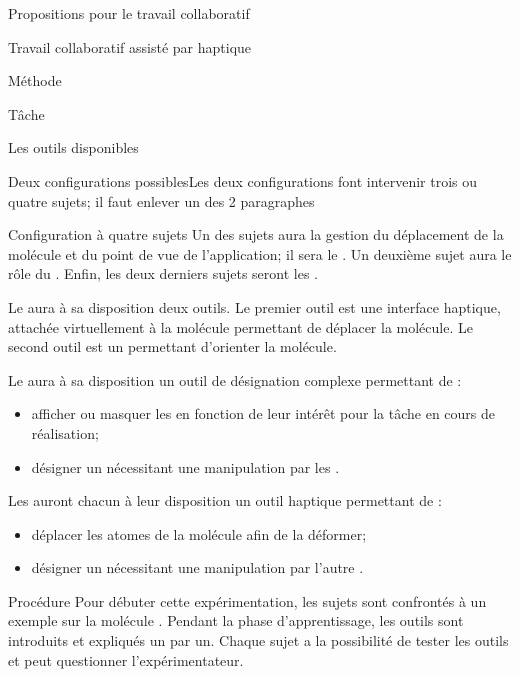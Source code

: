 \documentclass[myfrancais]{mythesis}
\begin{document}
\begin{mypart}{Propositions pour le travail collaboratif}
\begin{mychapter}{Travail collaboratif assisté par haptique}
\begin{mysection}{Méthode}
\begin{mysubsection}{Tâche}
\begin{mysubsubsection}{Les outils disponibles}
\begin{myTodo}{Deux configurations possibles}{Les deux configurations font intervenir trois ou quatre sujets; il faut enlever un des 2 paragraphes}
\begin{myparagraph}{Configuration à quatre sujets}
								Un des sujets aura la gestion du déplacement de la molécule et du point de vue de l'application; il sera le .
								Un deuxième sujet aura le rôle du .
								Enfin, les deux derniers sujets seront les .

								Le  aura à sa disposition deux outils.
								Le premier outil est une interface haptique, attachée virtuellement à la molécule permettant de déplacer la molécule.
								Le second outil est un \mySpaceNavigator permettant d'orienter la molécule.

								Le  aura à sa disposition un outil de désignation complexe permettant de :
								\begin{itemize}
									\item afficher ou masquer les  en fonction de leur intérêt pour la tâche en cours de réalisation;
									\item désigner un  nécessitant une manipulation par les .
								\end{itemize}
							\end{myparagraph}
						\end{myTodo}

						Les  auront chacun à leur disposition un outil haptique permettant de :
						\begin{itemize}
							\item déplacer les atomes de la molécule afin de la déformer;
							\item désigner un  nécessitant une manipulation par l'autre .
						\end{itemize}
					\end{mysubsubsection}
				\end{mysubsection}
				\begin{mysubsection}{Procédure}
					Pour débuter cette expérimentation, les sujets sont confrontés à un exemple sur la molécule .
					Pendant la phase d'apprentissage, les outils sont introduits et expliqués un par un.
					Chaque sujet a la possibilité de tester les outils et peut questionner l'expérimentateur.


\end{mysubsection}
\end{mysection}
\end{mychapter}
\end{mypart}
\end{document}
